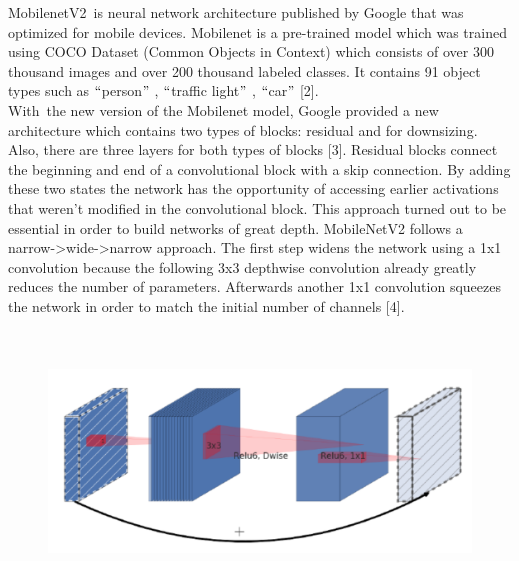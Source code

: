 \documentclass[12pt]{report}
\renewcommand{\_}{\kern-1.5pt\textunderscore\kern-1.5pt}
\begin{document}
\tab MobilenetV2\  is neural network architecture published by Google that was optimized for mobile devices. Mobilenet is a pre-trained model which was trained using COCO Dataset (Common Objects in Context) which consists of over 300 thousand images and over 200 thousand labeled classes. It contains 91 object types such as $``$person$"$ , $``$traffic light$"$ , $``$car$"$  [2]. \\
\tab With\ the new version of the Mobilenet model, Google provided a new architecture which contains two types of blocks: residual and for downsizing. Also, there are three layers for both types of blocks [3].  Residual blocks connect the beginning and end of a convolutional block with a skip connection. By adding these two states the network has the opportunity of accessing earlier activations that weren’t modified in the convolutional block. This approach turned out to be essential in order to build networks of great depth. MobileNetV2 follows a narrow->wide->narrow approach. The first step widens the network using a 1x1 convolution because the following 3x3 depthwise convolution already greatly reduces the number of parameters. Afterwards another 1x1 convolution squeezes the network in order to match the initial number of channels [4].\par

\tab \tab \tab \tab 
\vspace{\baselineskip}


\begin{figure}[H]
\advance\leftskip 0.0in		\includegraphics[width=6.27in,height=2.72in]{./media/image4.png}
\end{figure}


\end{document}
